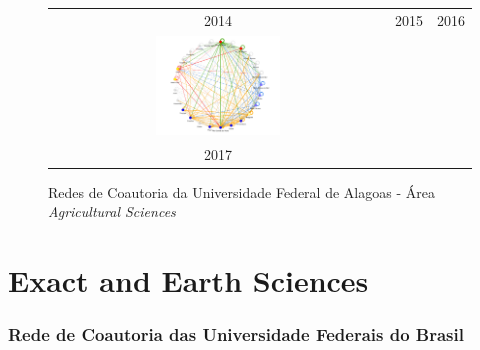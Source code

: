 \begin{figure}[H]
\begin{tabular}{ccc}
		2014 & 2015 & 2016\\[6pt]  \includegraphics[width=0.38\textwidth]{Imagens/rede-agr-AL-2017.pdf} & & \\
		2017 & & \\
	\end{tabular}
	\caption{Redes de Coautoria da Universidade Federal de Alagoas - Área \textit{Agricultural Sciences}}
\end{figure}


\section{\textbf{Exact and Earth Sciences}}

\subsubsection{Rede de Coautoria das Universidade Federais do Brasil}

